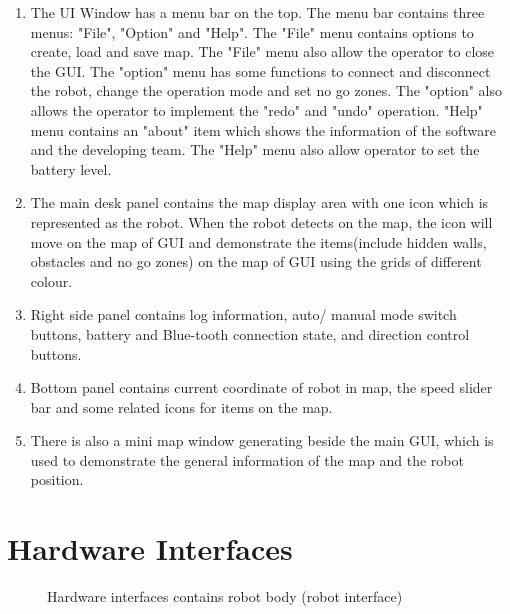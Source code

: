 \documentclass[11pt, a4paper]{report}
\begin{document}
\begin{enumerate}
\item The UI Window has a menu bar on the top. The menu bar contains three menus: "File", "Option" and "Help". The "File" menu contains options to create, load and save map. The "File" menu also allow the operator to close the GUI. The "option" menu has some functions to connect and disconnect the robot, change the operation mode and set no go zones. The "option" also allows the operator to implement the "redo" and "undo" operation. "Help" menu contains an "about" item which shows the information of the software and the developing team. The "Help" menu also allow operator to set the battery level. 
\item The main desk panel contains the map display area with one icon which is represented as the robot. When the robot detects on the map, the icon will move on the map of GUI and demonstrate the items(include hidden walls, obstacles and no go zones) on the map of GUI using the grids of different colour.
\item Right side panel contains log information, auto/ manual mode switch buttons, battery and Blue-tooth connection state, and direction control buttons. 
\item Bottom panel contains current coordinate of robot in map, the speed slider bar and some related icons for items on the map. 
\item There is also a mini map window generating beside the main GUI, which is used to demonstrate the general information of the map and the robot position. 
\end{enumerate}

\pagebreak

\section{Hardware Interfaces}


\begin{figure}[ht]
\centering
\setlength\fboxsep{2pt}
\setlength\fboxrule{0.2pt}
\caption{Hardware interfaces contains robot body (robot interface)}
\label{sec:GUI}
\label{fig:GUI}
\end{figure}
\end{document}

